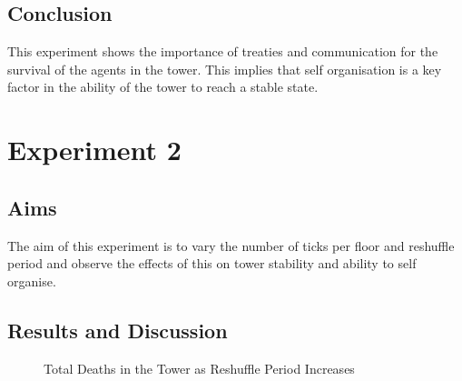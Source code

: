 \subsection{Conclusion}
\label{subsec: E1-Conclusion}
This experiment shows the importance of treaties and communication for the survival of the agents in the tower. This implies that self organisation is a key factor in the ability of the tower to reach a stable state.

\section{Experiment 2}
\label{subsec: Experiment 2}
\subsection{Aims}
\label{subsec: E2-Aims}
The aim of this experiment is to vary the number of ticks per floor and reshuffle period and observe the effects of this on tower stability and ability to self organise.
\subsection{Results and Discussion}
\label{subsec: E2-Results and Discussion}

\begin{figure}[H] %
    \centering
    \begin{minipage}{0.8\textwidth}
    \end{minipage}
    \caption{Total Deaths in the Tower as Reshuffle Period Increases}
    \label{fig:Number-of-Deaths-As-Shuffle-Period-Decreases}
\end{figure}



